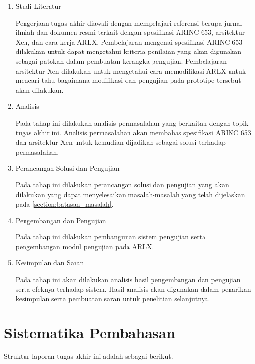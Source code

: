 \begin{enumerate}

    \item Studi Literatur

	Pengerjaan tugas akhir diawali dengan mempelajari referensi berupa jurnal ilmiah dan
	dokumen resmi terkait dengan spesifikasi ARINC 653, arsitektur Xen, dan cara kerja ARLX.
	Pembelajaran mengenai spesifikasi ARINC 653 dilakukan untuk dapat mengetahui kriteria
	penilaian yang akan digunakan sebagai patokan dalam pembuatan kerangka pengujian.
	Pembelajaran arsitektur Xen dilakukan untuk mengetahui cara memodifikasi ARLX untuk
	mencari tahu bagaimana modifikasi dan pengujian pada prototipe tersebut akan dilakukan.

    \item Analisis

	Pada tahap ini dilakukan analisis permasalahan yang berkaitan dengan topik tugas akhir
	ini.  Analisis permasalahan akan membahas spesifikasi ARINC 653 dan arsitektur Xen untuk
	kemudian dijadikan sebagai solusi terhadap permasalahan.

    \item Perancangan Solusi dan Pengujian

	Pada tahap ini dilakukan perancangan solusi dan pengujian yang akan dilakukan yang dapat
	menyelesaikan masalah\hyp{}masalah yang telah dijelaskan pada
	\autoref{section:batasan_masalah}.

    \item Pengembangan dan Pengujian

	Pada tahap ini dilakukan pembangunan sistem pengujian serta pengembangan modul
	pengujian pada ARLX.

    \item Kesimpulan dan Saran

	Pada tahap ini akan dilakukan analisis hasil pengembangan dan pengujian serta efeknya
	terhadap sistem. Hasil analisis akan digunakan dalam penarikan kesimpulan serta
	pembuatan saran untuk penelitian selanjutnya.

\end{enumerate}

\section{Sistematika Pembahasan}

Struktur laporan tugas akhir ini adalah sebagai berikut.

